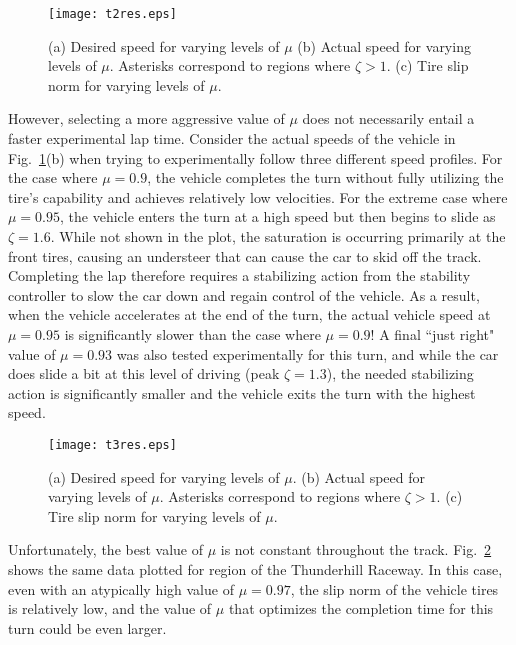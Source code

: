{{{\begin{figure}
\centering
\texttt{[image: t2res.eps]}
\caption[Desired speed for varying levels of $\mu$ - region 2]{(a) Desired speed for varying levels of $\mu$ (b) Actual speed for varying levels of $\mu$. Asterisks correspond to 
regions where $\zeta > 1$. (c) Tire slip norm for varying levels of $\mu$. }
\label{fig:t2}
\end{figure}

However, selecting a more aggressive value of $\mu$ does not necessarily entail a faster experimental lap time. Consider the actual speeds of the vehicle in
Fig.~\ref{fig:t2}(b) when trying to experimentally follow three different speed profiles. For the case where $\mu = 0.9$, the vehicle completes
the turn without fully utilizing the tire's capability and achieves relatively low velocities. For the extreme case where $\mu = 0.95$, the
vehicle enters the turn at a high speed but then begins to slide as $\zeta = 1.6$. While not shown in the plot, the saturation
is occurring primarily at the front tires, causing an understeer that can cause the car to skid off the track. Completing the lap therefore requires a stabilizing
action from the stability controller to slow the car down and regain control of the vehicle. As a result,
when the vehicle accelerates at the end of the turn, the actual vehicle speed at $\mu = 0.95$ is significantly slower than the case where $\mu = 0.9$!
A final ``just right" value of $\mu = 0.93$ was also tested experimentally for this turn, and while the car does slide a bit at this level of driving (peak $\zeta = 1.3$),
the needed stabilizing action is significantly smaller and the vehicle exits the turn with the highest speed. 

 \begin{figure}[tb]
\centering
\texttt{[image: t3res.eps]}
\caption[Desired speed for varying levels of $\mu$ - region 3]{(a) Desired speed for varying levels of $\mu$. (b) Actual speed for varying levels of $\mu$. Asterisks correspond to 
regions where $\zeta > 1$. (c) Tire slip norm for varying levels of $\mu$. }
\label{fig:t3}
\end{figure}

Unfortunately, the best value of $\mu$ is not constant throughout the track. Fig.~\ref{fig:t3} shows the same data plotted for region  of the 
Thunderhill Raceway. In this case, even with an atypically high value of 
$\mu = 0.97$, the slip norm of the vehicle tires is relatively low, and the value of $\mu$ that optimizes the completion time for this turn could 
be even larger. 

}}}
